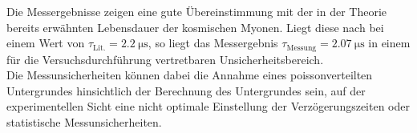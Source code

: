 \noindent Die Messergebnisse zeigen eine gute Übereinstimmung mit der in der
Theorie bereits erwähnten Lebensdauer der kosmischen Myonen. Liegt diese nach
\cite{grupen} bei einem Wert von $\tau_\text{Lit.} = \SI{2.2}{\micro\second}$,
so liegt das Messergebnis $\tau_\text{Messung} = \SI{2.07}{\micro\second}$ in
einem für die Versuchsdurchführung vertretbaren Unsicherheitsbereich. \\
Die Messunsicherheiten können dabei die Annahme eines poissonverteilten
Untergrundes hinsichtlich der Berechnung des Untergrundes sein, auf der
experimentellen Sicht eine nicht optimale Einstellung der Verzögerungszeiten
oder statistische Messunsicherheiten. 

